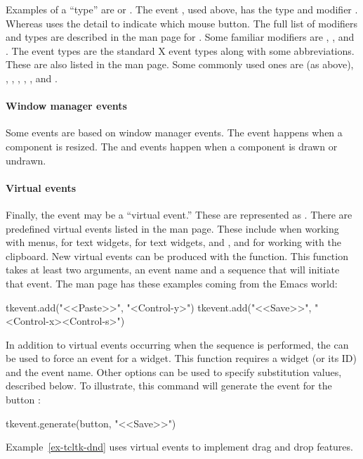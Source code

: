 Examples of a ``type'' are  or
. The event , used
above, has the type  and modifier . Whereas
 uses the detail  to indicate
which mouse button. The full list of modifiers and types are described
in the man page for . Some familiar modifiers are
, ,  and . The event
types are the standard X event types along with some
abbreviations. These are also listed in the  man page. Some
commonly used ones are  (as above), ,
, , ,
, and .

\paragraph{Window manager events}
Some events are based on window manager events. The 
event happens when a component is resized. The  and
 events happen when a component is drawn or undrawn.

\paragraph{Virtual events}
Finally, the event may be a ``virtual event.'' These are represented
as . There are predefined virtual
events listed in the  man page. These include
 when working with menus,
 for text widgets,
 for text widgets, and
,  and
 for working with the clipboard. New
virtual events can be produced with the 
function. This function takes at least two arguments, an event name and a
sequence that will initiate that event. The  man page has
these examples coming from the Emacs world:
\begin{Schunk}
\begin{Sinput}
  tkevent.add("<<Paste>>", "<Control-y>")
  tkevent.add("<<Save>>", "<Control-x><Control-s>")
\end{Sinput}
\end{Schunk}
%
In addition to virtual events occurring when the sequence is performed,
the  can be used to force an event for a
widget. This function requires a widget (or its ID) and the event
name. Other options can be used to specify substitution values,
described below. To illustrate, this command will generate the
 event for the button :
\begin{Schunk}
\begin{Sinput}
 tkevent.generate(button, "<<Save>>")
\end{Sinput}
\end{Schunk}
%
Example~\ref{ex-tcltk-dnd} uses virtual events to implement drag and
drop features.


